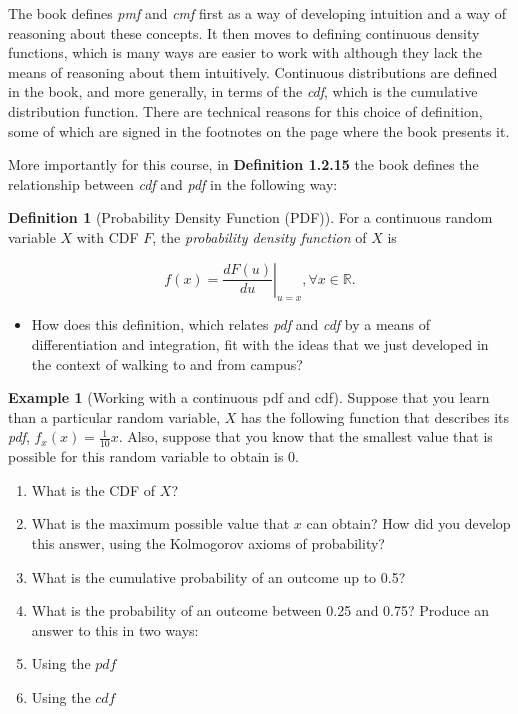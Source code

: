 \documentclass[
]{book}
\providecommand{\tightlist}{%
  \setlength{\itemsep}{0pt}\setlength{\parskip}{0pt}}
\theoremstyle{definition}
\newtheorem{definition}{Definition}[chapter]
\theoremstyle{definition}
\newtheorem{example}{Example}[chapter]
\theoremstyle{definition}
\theoremstyle{definition}
\theoremstyle{remark}
\begin{document}
The book defines \emph{pmf} and \emph{cmf} first as a way of developing intuition and a way of reasoning about these concepts. It then moves to defining continuous density functions, which is many ways are easier to work with although they lack the means of reasoning about them intuitively. Continuous distributions are defined in the book, and more generally, in terms of the \emph{cdf}, which is the cumulative distribution function. There are technical reasons for this choice of definition, some of which are signed in the footnotes on the page where the book presents it.

More importantly for this course, in \textbf{Definition 1.2.15} the book defines the relationship between \emph{cdf} and \emph{pdf} in the following way:

\begin{definition}[Probability Density Function (PDF)]
For a continuous random variable \(X\) with CDF \(F\), the \emph{probability density function} of \(X\) is

\[
  f(x) = \left. \frac{d F(u)}{du} \right|_{u=x}, \forall x \in \mathbb{R}.
\]
\end{definition}

\begin{itemize}
\tightlist
\item
  How does this definition, which relates \emph{pdf} and \emph{cdf} by a means of differentiation and integration, fit with the ideas that we just developed in the context of walking to and from campus?
\end{itemize}

\begin{example}[Working with a continuous pdf and cdf]

Suppose that you learn than a particular random variable, \(X\) has the following function that describes its \emph{pdf}, \(f_{x}(x) = \frac{1}{10}x\). Also, suppose that you know that the smallest value that is possible for this random variable to obtain is 0.

\begin{enumerate}
\def\labelenumi{\arabic{enumi}.}
\tightlist
\item
  What is the CDF of \(X\)?
\item
  What is the maximum possible value that \(x\) can obtain? How did you develop this answer, using the Kolmogorov axioms of probability?
\item
  What is the cumulative probability of an outcome up to 0.5?
\item
  What is the probability of an outcome between 0.25 and 0.75? Produce an answer to this in two ways:
\item
  Using the \(pdf\)
\item
  Using the \(cdf\)
\end{enumerate}

\end{example}
\end{document}
